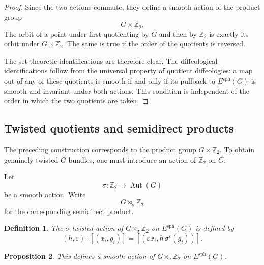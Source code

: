 \documentclass[11pt]{amsart}
\newtheorem{definition}{Definition}[section]
\newtheorem{proposition}[definition]{Proposition}
\begin{document}
\begin{proof}
Since the two actions commute, they define a smooth action of the product group
\[
G\times\mathbb Z_2.
\]
The orbit of a point under first quotienting by \(G\) and then by \(\mathbb Z_2\) is exactly its orbit under \(G\times\mathbb Z_2\). The same is true if the order of the quotients is reversed.

The set-theoretic identifications are therefore clear. The diffeological identifications follow from the universal property of quotient diffeologies: a map out of any of these quotients is smooth if and only if its pullback to \(E^{\mathrm{sph}}(G)\) is smooth and invariant under both actions. This condition is independent of the order in which the two quotients are taken.
\end{proof}

\subsection{Twisted quotients and semidirect products}

The preceding construction corresponds to the product group \(G\times\mathbb Z_2\). To obtain genuinely twisted \(G\)-bundles, one must introduce an action of \(\mathbb Z_2\) on \(G\).

Let
\[
\sigma:\mathbb Z_2\longrightarrow \operatorname{Aut}(G)
\]
be a smooth action. Write
\[
G\rtimes_\sigma \mathbb Z_2
\]
for the corresponding semidirect product.

\begin{definition}
The \(\sigma\)-twisted action of \(G\rtimes_\sigma\mathbb Z_2\) on \(E^{\mathrm{sph}}(G)\) is defined by
\[
(h,\varepsilon)\cdot[(x_i,g_i)]
=
[(\varepsilon x_i, h\,\sigma^\varepsilon(g_i))].
\]
\end{definition}

\begin{proposition}
This defines a smooth action of \(G\rtimes_\sigma\mathbb Z_2\) on \(E^{\mathrm{sph}}(G)\).
\end{proposition}
\end{document}
